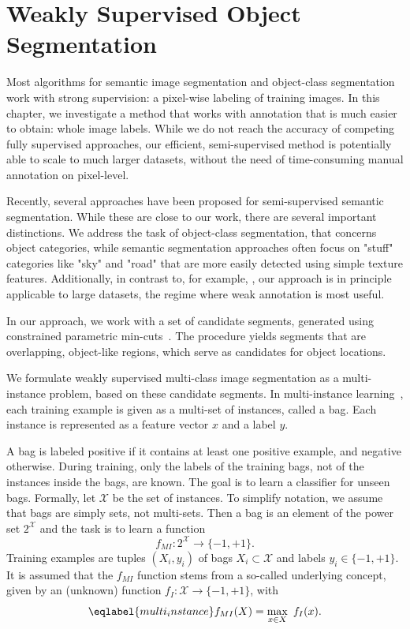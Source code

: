 \chapter{Weakly Supervised Object Segmentation}

Most algorithms for semantic image segmentation and object-class segmentation
work with strong supervision: a pixel-wise labeling of training images. In this
chapter, we investigate a method that works with annotation that is much
easier to obtain: whole image labels.
While we do not reach the accuracy of competing fully supervised approaches,
our efficient, semi-supervised method is potentially able to scale to much
larger datasets, without the need of time-consuming manual annotation on
pixel-level.

Recently, several approaches have been proposed for semi-supervised semantic
segmentation.  While these are close to our work, there are several important
distinctions.  We address the task of object-class segmentation, that concerns
object categories, while semantic segmentation approaches often focus on
"stuff" categories like "sky" and "road" that are more easily detected using
simple texture features.
Additionally, in contrast to, for example, \citet{vezhnevets2011weakly}, our approach is in
principle applicable to large datasets, the regime where weak annotation is
most useful.

In our approach, we work with a set of candidate segments, generated using
constrained parametric min-cuts~\citep{carreira2010constrained}.  The procedure yields
segments that are overlapping, object-like regions, which serve as candidates
for object locations.

We formulate weakly supervised multi-class image segmentation as a
multi-instance problem, based on these candidate segments.  In multi-instance
learning~\citep{dietterich1997solving}, each training example is given as a
multi-set of instances, called a bag.  Each instance is represented as a
feature vector $x$ and a label $y$.

A bag is labeled positive if it contains at least one positive example, and
negative otherwise.  During training, only the labels of the training bags, not
of the instances inside the bags, are known.  The goal is to learn a classifier
for unseen bags. 
Formally, let $\mathcal{X}$ be the set of instances. To simplify notation, we
assume that bags are simply sets, not multi-sets.  Then a bag is an element of
the power set $2^\mathcal{X}$ and the task is to learn a function
\begin{equation} f_{MI} \colon 2^\mathcal{X} \rightarrow \{-1,+1\}.  \end{equation}
Training examples are tuples $(X_i,y_i)$ of bags $X_i \subset \mathcal{X}$ and
labels $y_i \in \{-1,+1\}$.  It is assumed that the $f_{MI}$ function stems
from a so-called underlying concept, given by an (unknown) function
$f_{I} \colon \mathcal{X} \rightarrow \{-1,+1\}$, with 
\begin{equation}\eqlabel{multi_instance}
f_{MI}(X)= \max_{x \in X}\ f_{I}(x).
\end{equation}

